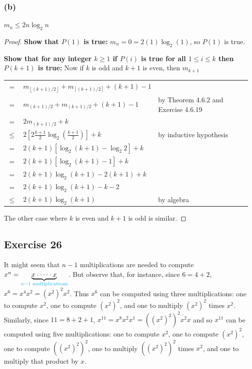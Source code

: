 \documentclass[14pt]{extarticle}
\newcommand{\cy}{\color{cyan}}
\newcommand{\floor}[1]{{\left\lfloor#1\right\rfloor}}
\newcommand{\ceil}[1]{{\left\lceil#1\right\rceil}}
\begin{document}
\subsubsection{(b)}
\(m_n \leq 2n \log_2 n\)
\begin{proof}
{\bf Show that \(P(1)\) is true:} \(m_n = 0 = 2(1) \log_2(1)\), so \(P(1)\) is true.

{\bf Show that for any integer \(k \geq 1\) if \(P(i)\) is true for all \(1 \leq i \leq k\) then \(P(k+1)\) is true:}
Now if \(k\) is odd and \(k+1\) is even, then \(m_{k+1}\)

\begin{tabular}{cll}
= & \(m_{\floor{(k+1)/2}} + m_{\ceil{(k+1)/2}} + (k+1) - 1\) & \\
= & \(m_{(k+1)/2} + m_{(k+1)/2} + (k+1) - 1\) & {\cy by Theorem 4.6.2 and Exercise 4.6.19} \\
= & \(2m_{(k+1)/2} + k\) & \\
\(\leq\) & \(2[2\frac{k+1}{2} \log_2\left(\frac{k+1}{2}\right)] + k\) & {\cy by inductive hypothesis} \\
= & \(2(k+1)[\log_2(k+1) - \log_2 2] + k\) &  \\
= & \(2(k+1)[\log_2(k+1) - 1] + k\) &  \\
= & \(2(k+1)\log_2(k+1) - 2(k+1) + k\) & \\
= & \(2(k+1)\log_2(k+1) - k - 2\) &  \\
\(\leq\) & \(2(k+1)\log_2(k+1)\) & {\cy by algebra} \\
\end{tabular}

The other case where \(k\) is even and \(k+1\) is odd is similar.
\end{proof}

\subsection{Exercise 26}
It might seem that \(n - 1\) multiplications are needed to compute \(x^n = \underbrace{x \cdot \cdots \cdot x}_{\cy n - 1 
\text{ multiplications}}\). But observe that, for instance, since \(6 = 4 + 2\), \(x^6 = x^4x^2 = (x^2)^2x^2\). Thus 
\(x^6\) can be computed using three multiplications: one to compute \(x^2\), one to compute \((x^2)^2\), and one to 
multiply \((x^2)^2\) times \(x^2\). Similarly, since \(11 = 8 + 2 + 1\), \(x^{11} = x^8 x^2 x^1 = ((x^2)^2)^2x^2x\) and so 
\(x^{11}\) can be computed using five multiplications: one to compute \(x^2\), one to compute \((x^2)^2\), one to compute 
\(((x^2)^2)^2\), one to multiply \(((x^2)^2)^2\) times \(x^2\), and one to multiply that product by \(x\).
\end{document}
